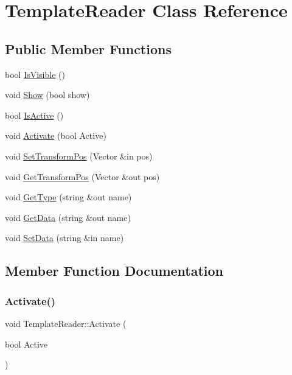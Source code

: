\hypertarget{class_template_reader}{}\section{Template\+Reader Class Reference}
\label{class_template_reader}
\subsection*{Public Member Functions}
\begin{DoxyCompactItemize}
\item 
bool \hyperlink{class_template_reader_aeadc3cc08487b8381a0574865482af6c}{Is\+Visible} ()
\item 
void \hyperlink{class_template_reader_ae378fdaa6d77e57385f2d94d6baddb3d}{Show} (bool show)
\item 
bool \hyperlink{class_template_reader_a39be7ab479352a578a1bb9d99dfbaf53}{Is\+Active} ()
\item 
void \hyperlink{class_template_reader_a99c2a061dd8126d7a2a87693fd5befe6}{Activate} (bool Active)
\item 
void \hyperlink{class_template_reader_a582b3ed3c87a7d44670101320d18b478}{Set\+Transform\+Pos} (Vector \&in pos)
\item 
void \hyperlink{class_template_reader_a0d1c978ffb2e5daffd32a2707e1c1bd9}{Get\+Transform\+Pos} (Vector \&out pos)
\item 
void \hyperlink{class_template_reader_a90a40fb675f5e3a27f0d937451b4d96d}{Get\+Type} (string \&out name)
\item 
void \hyperlink{class_template_reader_a6707e50f2d652ad8a71bcb1792fe0bbb}{Get\+Data} (string \&out name)
\item 
void \hyperlink{class_template_reader_afa51c2d798afebf1bc300429bb5d3441}{Set\+Data} (string \&in name)
\end{DoxyCompactItemize}


\subsection{Member Function Documentation}
\hypertarget{class_template_reader_a99c2a061dd8126d7a2a87693fd5befe6}{}\label{class_template_reader_a99c2a061dd8126d7a2a87693fd5befe6} 
\subsubsection{\texorpdfstring{Activate()}{Activate()}}
{\footnotesize\ttfamily void Template\+Reader\+::\+Activate (\begin{DoxyParamCaption}\item[{bool}]{Active }\end{DoxyParamCaption})}

